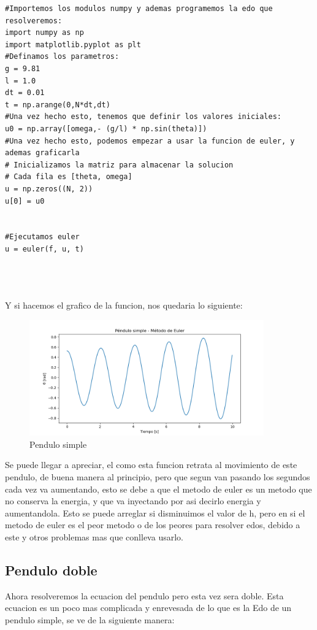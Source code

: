 \documentclass[11pt,a4paper]{article}
\begin{document}
\begin{lstlisting}[caption={Definamos la funcion y todos los parametros}]
#Importemos los modulos numpy y ademas programemos la edo que resolveremos:
import numpy as np
import matplotlib.pyplot as plt
#Definamos los parametros:
g = 9.81
l = 1.0
dt = 0.01
t = np.arange(0,N*dt,dt)
#Una vez hecho esto, tenemos que definir los valores iniciales:
u0 = np.array([omega,- (g/l) * np.sin(theta)])
#Una vez hecho esto, podemos empezar a usar la funcion de euler, y ademas graficarla
# Inicializamos la matriz para almacenar la solucion
# Cada fila es [theta, omega]
u = np.zeros((N, 2))
u[0] = u0


#Ejecutamos euler
u = euler(f, u, t)




\end{lstlisting}

Y si hacemos el grafico de la funcion, nos quedaria lo siguiente:

\begin{figure}[h]  %
    \centering
    \includegraphics[width=0.9\textwidth]{img/Figure_1.png}  %
    \caption{Pendulo simple}
    \label{fig:Pendulo_Simple}
\end{figure}

Se puede llegar a apreciar, el como esta funcion retrata al movimiento de este pendulo, de buena manera al principio, pero que segun van pasando los segundos cada vez va aumentando, esto se debe a que el metodo de euler es un metodo que no conserva la energia, y que va inyectando por asi decirlo energia y aumentandola. Esto se puede arreglar si disminuimos el valor de h, pero en si el metodo de euler es el peor metodo o de los peores para resolver edos, debido a este y otros problemas mas que conlleva usarlo.


\subsection{Pendulo doble}
Ahora resolveremos la ecuacion del pendulo pero esta vez sera doble. Esta ecuacion es un poco mas complicada y enrevesada de lo que es la Edo de un pendulo simple, se ve de la siguiente manera:
\end{document}
